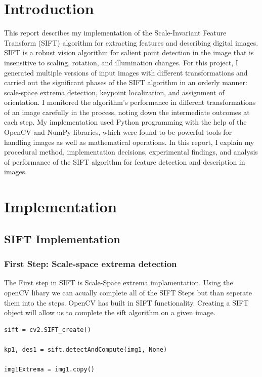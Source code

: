 \chapter{Introduction}
\label{ch:intro}
This report describes my implementation of the Scale-Invariant Feature Transform (SIFT) algorithm for extracting features and describing digital images. SIFT is a robust vision algorithm for salient point detection in the image that is insensitive to scaling, rotation, and illumination changes. For this project, I generated multiple versions of input images with different transformations and carried out the significant phases of the SIFT algorithm in an orderly manner: scale-space extrema detection, keypoint localization, and assignment of orientation. I monitored the algorithm's performance in different transformations of an image carefully in the process, noting down the intermediate outcomes at each step. My implementation used Python programming with the help of the OpenCV and NumPy libraries, which were found to be powerful tools for handling images as well as mathematical operations. In this report, I explain my procedural method, implementation decisions, experimental findings, and analysis of performance of the SIFT algorithm for feature detection and description in images.
\chapter{Implementation}
\section{SIFT Implementation}
\subsection{First Step: Scale-space extrema detection}
The First step in SIFT is Scale-Space extrema implamentation. Using the openCV libary we can acually complete all of the SIFT Steps but than seperate them into the steps. OpenCV has built in SIFT functionality. Creating a SIFT object will allow us to complete the sift algorithm on a given image.
\begin{verbatim}
sift = cv2.SIFT_create()

kp1, des1 = sift.detectAndCompute(img1, None)

img1Extrema = img1.copy()
\end{verbatim}

